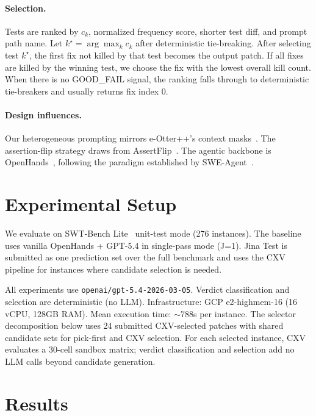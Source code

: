 \documentclass{article}
\begin{document}
\paragraph{Selection.} Tests are ranked by $c_k$, normalized frequency score, shorter test diff, and prompt path name. Let $k^\star=\arg\max_k c_k$ after deterministic tie-breaking. After selecting test $k^\star$, the first fix not killed by that test becomes the output patch. If all fixes are killed by the winning test, we choose the fix with the lowest overall kill count. When there is no GOOD\_FAIL signal, the ranking falls through to deterministic tie-breakers and usually returns fix index 0.

\paragraph{Design influences.} Our heterogeneous prompting mirrors e-Otter++'s context masks~\cite{chen2024e}. The assertion-flip strategy draws from AssertFlip~\cite{mundler2024assertflip}. The agentic backbone is OpenHands~\cite{wang2024openhands}, following the paradigm established by SWE-Agent~\cite{yang2024sweagent}.

\section{Experimental Setup}

We evaluate on SWT-Bench Lite~\cite{mundler2024swt} unit-test mode (276 instances). The baseline uses vanilla OpenHands + GPT-5.4 in single-pass mode (J=1). Jina Test is submitted as one prediction set over the full benchmark and uses the CXV pipeline for instances where candidate selection is needed.

All experiments use \texttt{openai/gpt-5.4-2026-03-05}. Verdict classification and selection are deterministic (no LLM). Infrastructure: GCP e2-highmem-16 (16 vCPU, 128GB RAM). Mean execution time: $\sim$788s per instance. The selector decomposition below uses 24 submitted CXV-selected patches with shared candidate sets for pick-first and CXV selection. For each selected instance, CXV evaluates a 30-cell sandbox matrix; verdict classification and selection add no LLM calls beyond candidate generation.

\section{Results}
\end{document}
